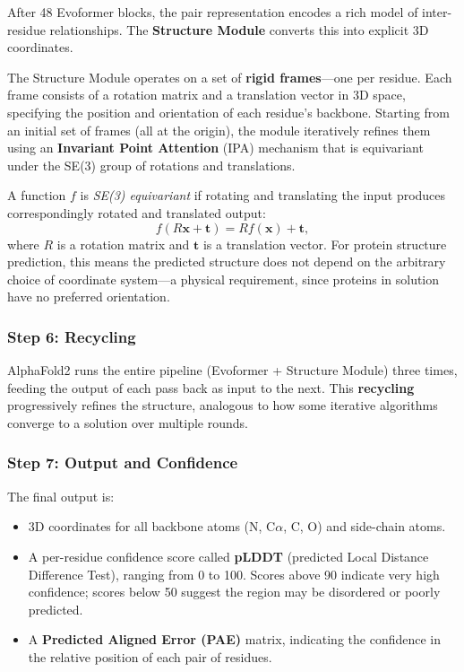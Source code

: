 After 48 Evoformer blocks, the pair representation encodes a rich model of inter-residue relationships. The \textbf{Structure Module} converts this into explicit 3D coordinates.

The Structure Module operates on a set of \textbf{rigid frames}---one per residue. Each frame consists of a rotation matrix and a translation vector in 3D space, specifying the position and orientation of each residue's backbone. Starting from an initial set of frames (all at the origin), the module iteratively refines them using an \textbf{Invariant Point Attention} (IPA) mechanism that is equivariant under the SE(3) group of rotations and translations.

\begin{dogmadef}[SE(3) Equivariance]
A function $f$ is \emph{SE(3) equivariant} if rotating and translating the input produces correspondingly rotated and translated output:
\begin{equation}
f(R\mathbf{x} + \mathbf{t}) = Rf(\mathbf{x}) + \mathbf{t},
\end{equation}
where $R$ is a rotation matrix and $\mathbf{t}$ is a translation vector. For protein structure prediction, this means the predicted structure does not depend on the arbitrary choice of coordinate system---a physical requirement, since proteins in solution have no preferred orientation.
\end{dogmadef}

\subsubsection{Step 6: Recycling}

AlphaFold2 runs the entire pipeline (Evoformer + Structure Module) three times, feeding the output of each pass back as input to the next. This \textbf{recycling} progressively refines the structure, analogous to how some iterative algorithms converge to a solution over multiple rounds.

\subsubsection{Step 7: Output and Confidence}

The final output is:
\begin{itemize}[leftmargin=1.5em]
  \item 3D coordinates for all backbone atoms (N, C$\alpha$, C, O) and side-chain atoms.
  \item A per-residue confidence score called \textbf{pLDDT} (predicted Local Distance Difference Test), ranging from 0 to 100. Scores above 90 indicate very high confidence; scores below 50 suggest the region may be disordered or poorly predicted.
  \item A \textbf{Predicted Aligned Error (PAE)} matrix, indicating the confidence in the relative position of each pair of residues.
\end{itemize}

